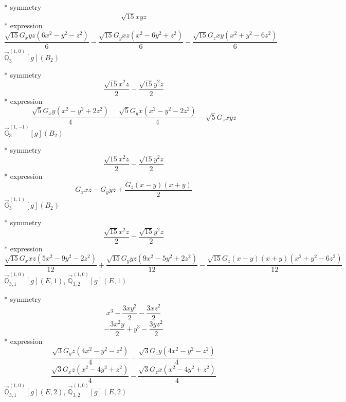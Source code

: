 \documentclass[fleqn,8pt]{jsarticle}
\begin{document}
\noindent\quad ** symmetry
\begin{dmath*}
\sqrt{15} x y z
\end{dmath*}
\noindent\quad ** expression
\begin{dmath*}
\frac{\sqrt{15} G_{x} y z \left(6 x^{2} - y^{2} - z^{2}\right)}{6} - \frac{\sqrt{15} G_{y} x z \left(x^{2} - 6 y^{2} + z^{2}\right)}{6} - \frac{\sqrt{15} G_{z} x y \left(x^{2} + y^{2} - 6 z^{2}\right)}{6}
\end{dmath*}
\noindent\quad $\vec{\mathbb{Q}}_{3}^{(1,0)}[g](B_{2})$

\noindent\quad ** symmetry
\begin{dmath*}
\frac{\sqrt{15} x^{2} z}{2} - \frac{\sqrt{15} y^{2} z}{2}
\end{dmath*}
\noindent\quad ** expression
\begin{dmath*}
\frac{\sqrt{5} G_{x} y \left(x^{2} - y^{2} + 2 z^{2}\right)}{4} - \frac{\sqrt{5} G_{y} x \left(x^{2} - y^{2} - 2 z^{2}\right)}{4} - \sqrt{5} G_{z} x y z
\end{dmath*}
\noindent\quad $\vec{\mathbb{G}}_{3}^{(1,-1)}[g](B_{2})$

\noindent\quad ** symmetry
\begin{dmath*}
\frac{\sqrt{15} x^{2} z}{2} - \frac{\sqrt{15} y^{2} z}{2}
\end{dmath*}
\noindent\quad ** expression
\begin{dmath*}
G_{x} x z - G_{y} y z + \frac{G_{z} \left(x - y\right) \left(x + y\right)}{2}
\end{dmath*}
\noindent\quad $\vec{\mathbb{G}}_{3}^{(1,1)}[g](B_{2})$

\noindent\quad ** symmetry
\begin{dmath*}
\frac{\sqrt{15} x^{2} z}{2} - \frac{\sqrt{15} y^{2} z}{2}
\end{dmath*}
\noindent\quad ** expression
\begin{dmath*}
\frac{\sqrt{15} G_{x} x z \left(5 x^{2} - 9 y^{2} - 2 z^{2}\right)}{12} + \frac{\sqrt{15} G_{y} y z \left(9 x^{2} - 5 y^{2} + 2 z^{2}\right)}{12} - \frac{\sqrt{15} G_{z} \left(x - y\right) \left(x + y\right) \left(x^{2} + y^{2} - 6 z^{2}\right)}{12}
\end{dmath*}
\noindent\quad $\vec{\mathbb{Q}}_{3,1}^{(1,0)}[g](E,1)$, $\vec{\mathbb{Q}}_{3,2}^{(1,0)}[g](E,1)$

\noindent\quad ** symmetry
\begin{dmath*}
x^{3} - \frac{3 x y^{2}}{2} - \frac{3 x z^{2}}{2}
\end{dmath*}
\begin{dmath*}
- \frac{3 x^{2} y}{2} + y^{3} - \frac{3 y z^{2}}{2}
\end{dmath*}
\noindent\quad ** expression
\begin{dmath*}
\frac{\sqrt{3} G_{y} z \left(4 x^{2} - y^{2} - z^{2}\right)}{4} - \frac{\sqrt{3} G_{z} y \left(4 x^{2} - y^{2} - z^{2}\right)}{4}
\end{dmath*}
\begin{dmath*}
\frac{\sqrt{3} G_{x} z \left(x^{2} - 4 y^{2} + z^{2}\right)}{4} - \frac{\sqrt{3} G_{z} x \left(x^{2} - 4 y^{2} + z^{2}\right)}{4}
\end{dmath*}
\noindent\quad $\vec{\mathbb{Q}}_{3,1}^{(1,0)}[g](E,2)$, $\vec{\mathbb{Q}}_{3,2}^{(1,0)}[g](E,2)$
\end{document}
